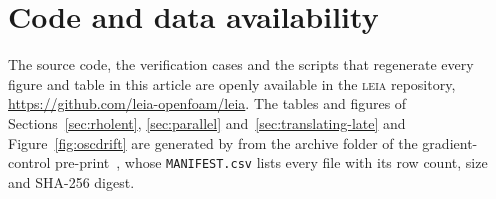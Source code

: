 \documentclass[preprint,3p,11pt]{elsarticle}
\begin{document}
\section*{Code and data availability}
The source code, the verification cases and the scripts that regenerate every figure
and table in this article are openly available in the \textsc{leia} repository,
\url{https://github.com/leia-openfoam/leia}.
The tables and figures of Sections~\ref{sec:rholent}, \ref{sec:parallel}
and~\ref{sec:translating-late} and Figure~\ref{fig:oscdrift} are generated by
from the archive folder
of the gradient-control pre-print~\cite{maric2026gcls}, whose \texttt{MANIFEST.csv} lists
every file with its row count, size and SHA-256 digest.




\end{document}
